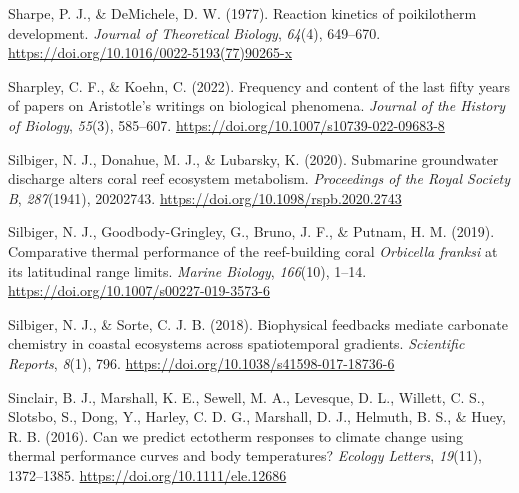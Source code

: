 \documentclass{CSUNthesis}
\begin{document}
\vspace{0.1em}

Sharpe, P. J., \& DeMichele, D. W. (1977). Reaction kinetics of poikilotherm development. \textit{Journal of Theoretical Biology}, \textit{64}(4), 649--670. \url{https://doi.org/10.1016/0022-5193(77)90265-x}

\vspace{0.1em}

Sharpley, C. F., \& Koehn, C. (2022). Frequency and content of the last fifty years of papers on Aristotle's writings on biological phenomena. \textit{Journal of the History of Biology}, \textit{55}(3), 585--607. \url{https://doi.org/10.1007/s10739-022-09683-8}

\vspace{0.1em}

Silbiger, N. J., Donahue, M. J., \& Lubarsky, K. (2020). Submarine groundwater discharge alters coral reef ecosystem metabolism. \textit{Proceedings of the Royal Society B}, \textit{287}(1941), 20202743. \url{https://doi.org/10.1098/rspb.2020.2743}

\vspace{0.1em}

Silbiger, N. J., Goodbody-Gringley, G., Bruno, J. F., \& Putnam, H. M. (2019). Comparative thermal performance of the reef-building coral \textit{Orbicella franksi} at its latitudinal range limits. \textit{Marine Biology}, \textit{166}(10), 1--14. \url{https://doi.org/10.1007/s00227-019-3573-6}

\vspace{0.1em}

Silbiger, N. J., \& Sorte, C. J. B. (2018). Biophysical feedbacks mediate carbonate chemistry in coastal ecosystems across spatiotemporal gradients. \textit{Scientific Reports}, \textit{8}(1), 796. \url{https://doi.org/10.1038/s41598-017-18736-6}

\vspace{0.1em}

\vspace{0.1em}

Sinclair, B. J., Marshall, K. E., Sewell, M. A., Levesque, D. L., Willett, C. S., Slotsbo, S., Dong, Y., Harley, C. D. G., Marshall, D. J., Helmuth, B. S., \& Huey, R. B. (2016). Can we predict ectotherm responses to climate change using thermal performance curves and body temperatures? \textit{Ecology Letters}, \textit{19}(11), 1372--1385. \url{https://doi.org/10.1111/ele.12686}

\vspace{0.1em}
\end{document}

